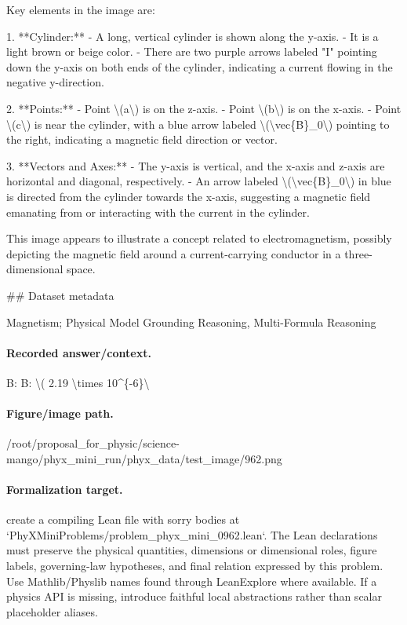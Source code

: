 Key elements in the image are:

1. **Cylinder:**
   - A long, vertical cylinder is shown along the y-axis.
   - It is a light brown or beige color.
   - There are two purple arrows labeled "I" pointing down the y-axis on both ends of the cylinder, indicating a current flowing in the negative y-direction.

2. **Points:**
   - Point \textbackslash{}(a\textbackslash{}) is on the z-axis.
   - Point \textbackslash{}(b\textbackslash{}) is on the x-axis.
   - Point \textbackslash{}(c\textbackslash{}) is near the cylinder, with a blue arrow labeled \textbackslash{}(\textbackslash{}vec\{B\}\_0\textbackslash{}) pointing to the right, indicating a magnetic field direction or vector.

3. **Vectors and Axes:**
   - The y-axis is vertical, and the x-axis and z-axis are horizontal and diagonal, respectively.
   - An arrow labeled \textbackslash{}(\textbackslash{}vec\{B\}\_0\textbackslash{}) in blue is directed from the cylinder towards the x-axis, suggesting a magnetic field emanating from or interacting with the current in the cylinder.

This image appears to illustrate a concept related to electromagnetism, possibly depicting the magnetic field around a current-carrying conductor in a three-dimensional space.

\#\# Dataset metadata

Magnetism; Physical Model Grounding Reasoning, Multi-Formula Reasoning

\paragraph{Recorded answer/context.}
B: B: \textbackslash{}( 2.19 \textbackslash{}times 10\textasciicircum{}\{-6\}\textbackslash{}

\paragraph{Figure/image path.}
/root/proposal\_for\_physic/science-mango/phyx\_mini\_run/phyx\_data/test\_image/962.png

\paragraph{Formalization target.}
create a compiling Lean file with sorry bodies at `PhyXMiniProblems/problem\_phyx\_mini\_0962.lean`. The Lean declarations must preserve the physical quantities, dimensions or dimensional roles, figure labels, governing-law hypotheses, and final relation expressed by this problem.
Use Mathlib/Physlib names found through LeanExplore where available. If a physics API is missing, introduce faithful local abstractions rather than scalar placeholder aliases.

